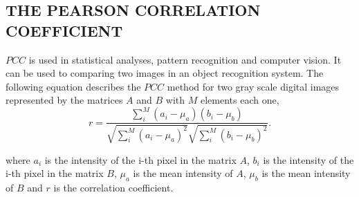 
\subsection{THE PEARSON CORRELATION COEFFICIENT}

$PCC$ is used in statistical analyses, pattern recognition and computer vision. 
It can be used to comparing two images in an object recognition system. 
The following equation describes the $PCC$ method for two gray scale digital images\cite{Eugene}
represented by the matrices $A$ and $B$ with $M$ elements each one,
\begin{equation}
r = \frac{\sum \limits_{i}^{M} (a_i-\mu_a)(b_i-\mu_b)}{\sqrt{\sum \limits_{i}^{M} (a_i-\mu_a)^2} \sqrt{\sum\limits_{i}^{M} (b_i-\mu_b)^2}}.
\end{equation}

where $a_i$ is the intensity of the i-th pixel in the  matrix $A$, 
$b_i$ is the intensity of the i-th pixel in the matrix $B$, 
$\mu_a$ is the mean intensity of $A$,
$\mu_b$ is the mean intensity of $B$ and
$r$ is the correlation coefficient\cite{Miranda Neto}.
